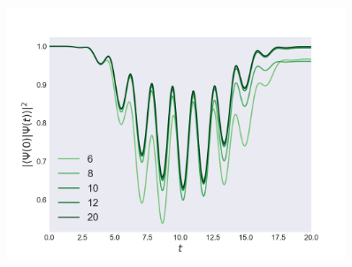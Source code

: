 \begin{figure}
    \centering
    \includegraphics[width=0.9\textwidth]{results/figures/1D/n=2overlap.png} 
    \caption{}
    \label{}
\end{figure}
